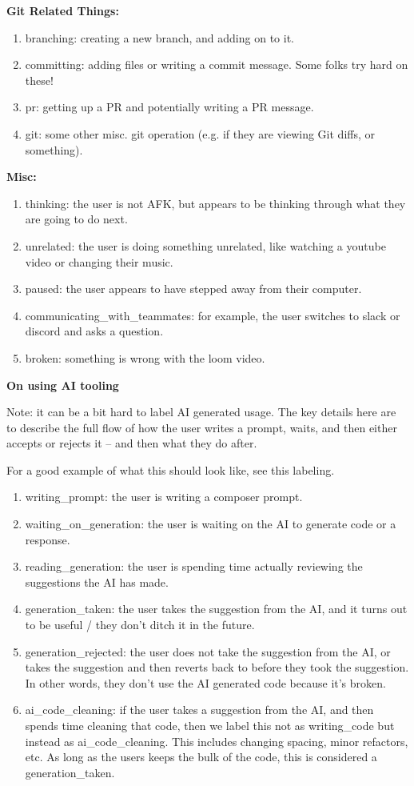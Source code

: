 \documentclass{article}
\begin{document}
\begin{instructionbox}
\textbf{Git Related Things:}
\begin{enumerate}
    \item branching: creating a new branch, and adding on to it.
    \item committing: adding files or writing a commit message. Some folks try hard on these!
    \item pr: getting up a PR and potentially writing a PR message.
    \item git: some other misc. git operation (e.g. if they are viewing Git diffs, or something).
\end{enumerate}

\textbf{Misc:}
\begin{enumerate}
    \item thinking: the user is not AFK, but appears to be thinking through what they are going to do next.
    \item unrelated: the user is doing something unrelated, like watching a youtube video or changing their music.
    \item paused: the user appears to have stepped away from their computer.
    \item communicating\_with\_teammates: for example, the user switches to slack or discord and asks a question.
    \item broken: something is wrong with the loom video.
\end{enumerate}

\textbf{On using AI tooling}

Note: it can be a bit hard to label AI generated usage. The key details here are to describe the full flow of how the user writes a prompt, waits, and then either accepts or rejects it – and then what they do after.

For a good example of what this should look like, see this labeling.

\begin{enumerate}
    \item writing\_prompt: the user is writing a composer prompt.
    \item waiting\_on\_generation: the user is waiting on the AI to generate code or a response.
    \item reading\_generation: the user is spending time actually reviewing the suggestions the AI has made.
    \item generation\_taken: the user takes the suggestion from the AI, and it turns out to be useful / they don’t ditch it in the future.
    \item generation\_rejected: the user does not take the suggestion from the AI, or takes the suggestion and then reverts back to before they took the suggestion. In other words, they don’t use the AI generated code because it’s broken.
    \item ai\_code\_cleaning: if the user takes a suggestion from the AI, and then spends time cleaning that code, then we label this not as writing\_code but instead as ai\_code\_cleaning. This includes changing spacing, minor refactors, etc. As long as the users keeps the bulk of the code, this is considered a generation\_taken.
\end{enumerate}


\end{instructionbox}
\end{document}
